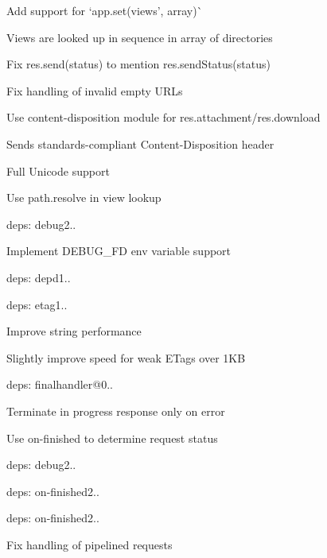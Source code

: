 {\ttfamily 
\begin{DoxyItemize}
\item Add support for `app.\+set(\textquotesingle{}views', array)\`{}
\begin{DoxyItemize}
\item Views are looked up in sequence in array of directories
\end{DoxyItemize}
\item Fix {\ttfamily res.\+send(status)} to mention {\ttfamily res.\+send\+Status(status)}
\item Fix handling of invalid empty U\+R\+Ls
\item Use {\ttfamily content-\/disposition} module for {\ttfamily res.\+attachment}/{\ttfamily res.\+download}
\begin{DoxyItemize}
\item Sends standards-\/compliant {\ttfamily Content-\/\+Disposition} header
\item Full Unicode support
\end{DoxyItemize}
\item Use {\ttfamily path.\+resolve} in view lookup
\item deps\+: debug2..
\begin{DoxyItemize}
\item Implement {\ttfamily D\+E\+B\+U\+G\+\_\+\+FD} env variable support
\end{DoxyItemize}
\item deps\+: depd1..
\item deps\+: etag1..
\begin{DoxyItemize}
\item Improve string performance
\item Slightly improve speed for weak E\+Tags over 1\+KB
\end{DoxyItemize}
\item deps\+: finalhandler@0..
\begin{DoxyItemize}
\item Terminate in progress response only on error
\item Use {\ttfamily on-\/finished} to determine request status
\item deps\+: debug2..
\item deps\+: on-\/finished2..
\end{DoxyItemize}
\item deps\+: on-\/finished2..
\begin{DoxyItemize}
\item Fix handling of pipelined requests

\end{DoxyItemize}
\end{DoxyItemize}}
